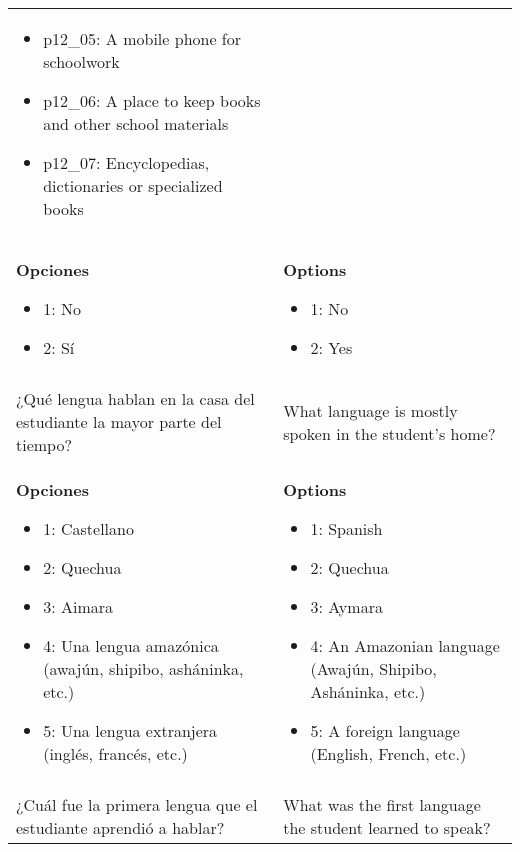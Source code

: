 \documentclass[11pt]{article}
\begin{document}
\begin{longtable}{@{}LL@{}}
\begin{itemize}[leftmargin=*]
\item p12\_05: A mobile phone for schoolwork
\item p12\_06: A place to keep books and other school materials
\item p12\_07: Encyclopedias, dictionaries or specialized books\end{itemize} \\
\textbf{Opciones}\par\begin{itemize}[leftmargin=*]\item 1: No
\item 2: Sí\end{itemize} & \textbf{Options}\par\begin{itemize}[leftmargin=*]\item 1: No
\item 2: Yes\end{itemize} \\
\addlinespace[4pt]
 \\ 
¿Qué lengua hablan en la casa del estudiante la mayor parte del tiempo? & What language is mostly spoken in the student's home? \\
\textbf{Opciones}\par\begin{itemize}[leftmargin=*]\item 1: Castellano
\item 2: Quechua
\item 3: Aimara
\item 4: Una lengua amazónica (awajún, shipibo, asháninka, etc.)
\item 5: Una lengua extranjera (inglés, francés, etc.)\end{itemize} & \textbf{Options}\par\begin{itemize}[leftmargin=*]\item 1: Spanish
\item 2: Quechua
\item 3: Aymara
\item 4: An Amazonian language (Awajún, Shipibo, Asháninka, etc.)
\item 5: A foreign language (English, French, etc.)\end{itemize} \\
\addlinespace[4pt]
 \\ 
¿Cuál fue la primera lengua que el estudiante aprendió a hablar? & What was the first language the student learned to speak? \\

\end{longtable}
\end{document}
